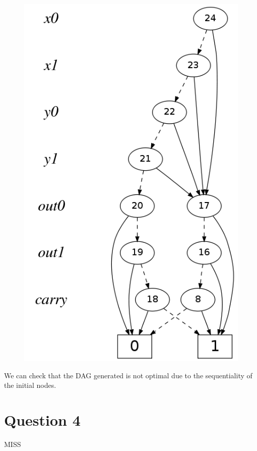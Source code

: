 \documentclass[a4paper]{article}
\begin{document}
	\begin{figure}[h]
			\includegraphics[scale=0.3]{img/q3i1}
	\end{figure}
	
	We can check that the DAG generated is not optimal due to the sequentiality of the initial nodes.

\section*{Question 4}

	MISS
\end{document}
